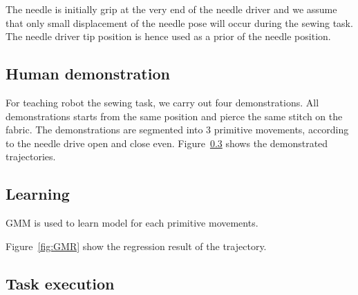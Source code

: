 The needle is initially grip at the very end of the needle driver and we assume that only small displacement of the needle pose will occur during the sewing task. The needle driver tip position is hence used as a prior of the needle position. 

\subsection{Human demonstration}
For teaching robot the sewing task, we carry out four demonstrations. All demonstrations starts from the same position and pierce the same stitch on the fabric. The demonstrations are segmented into 3 primitive movements, according to the needle drive open and close even. Figure~\ref{} shows the demonstrated trajectories. 

\subsection{Learning}
GMM is used to learn model for each primitive movements. 


Figure~\ref{fig:GMR} show the regression result of the trajectory.
\subsection{Task execution}
